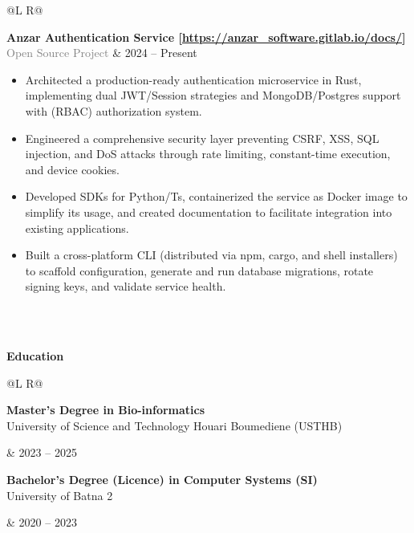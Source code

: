 \documentclass[a4paper,portrait]{article}
\newcommand{\lighttext}[1]{\textcolor{gray}{#1}}
\begin{document}
\begin{tabularx}{\textwidth}{@{}L R@{}}
  \toprule

  \textbf{Anzar Authentication Service [\url{https://anzar_software.gitlab.io/docs/}]}\\

  \lighttext{Open Source Project} & 2024 -- Present\\[0.2cm]

  \begin{minipage}[t]{\linewidth}
    \begin{itemize}[noitemsep,topsep=0pt,parsep=0pt,partopsep=0pt]
      \item Architected a production-ready authentication microservice in Rust, implementing dual JWT/Session strategies and MongoDB/Postgres support with (RBAC) authorization system.

      \item Engineered a comprehensive security layer preventing CSRF, XSS, SQL injection, and DoS attacks through rate limiting, constant-time execution, and device cookies.

      \item Developed SDKs for Python/Ts, containerized the service as Docker image to simplify its usage, and created documentation to facilitate integration into existing applications.

      \item Built a cross-platform CLI (distributed via npm, cargo, and shell installers) to scaffold configuration, generate and run database migrations, rotate signing keys, and validate service health.


    \end{itemize}
  \end{minipage}\\\\
\end{tabularx}


\begin{minipage}[t]{\linewidth}
  \textbf{Education}
\end{minipage}

\begin{tabularx}{\textwidth}{@{}L R@{}}
  \toprule
  \begin{minipage}[t]{\linewidth}
    \textbf{Master's Degree in Bio-informatics}\\
    University of Science and Technology Houari Boumediene (USTHB) \\
  \end{minipage} & 2023 -- 2025 \\

  \begin{minipage}[t]{\linewidth}
    \textbf{Bachelor's Degree (Licence) in Computer Systems (SI)}\\
    University of Batna 2 \\
  \end{minipage} & 2020 -- 2023 \\
\end{tabularx}
\end{document}
